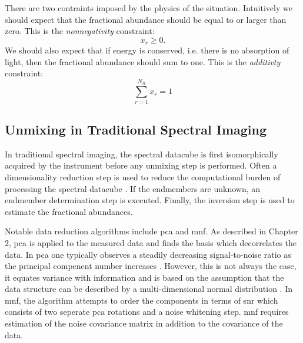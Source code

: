 There are two contraints imposed by the physics of the situation. Intuitively we should expect that the fractional abundance should be equal to or larger than zero. This is the \emph{nonnegativity} constraint:
%
\begin{equation}
	x_r \geq 0.
\end{equation}
%
We should also expect that if energy is conserved, i.e. there is no absorption of light, then the \gls{fractional abundance} should sum to one. This is the \emph{additivty} constraint:
%
\begin{equation}
	\sum_{r = 1}^{N_{R}} x_r = 1
\end{equation}


\subsection{Unmixing in Traditional Spectral Imaging}

In traditional spectral imaging, the spectral datacube is first isomorphically acquired by the instrument before any unmixing step is performed. Often a \gls{dimensionality reduction} step is used to reduce the computational burden of processing the spectral datacube \cite{keshava2002spectral, keshava2003survey}. If the endmembers are unknown, an \gls{endmember determination} step is executed. Finally, the \gls{inversion} step is used to estimate the fractional abundances. 

Notable data reduction algorithms include \acrfull{pca} and \acrfull{mnf}. As described in Chapter 2, \gls{pca} is applied to the measured data and finds the basis which decorrelates the data. In \gls{pca} one typically observes a steadily decreasing signal-to-noise ratio as the principal compenent number increases \cite{green1988transformation}. However, this is not always the case, it equates variance with information and is based on the assumption that the data structure can be described by a multi-dimensional normal distribution \cite{philpot2015mnf}. In \gls{mnf}, the algorithm attempts to order the components in terms of \gls{snr} which consists of two seperate \gls{pca} rotations and a noise whitening step. \gls{mnf} requires estimation of the noise covariance matrix in addition to the covariance of the data.


